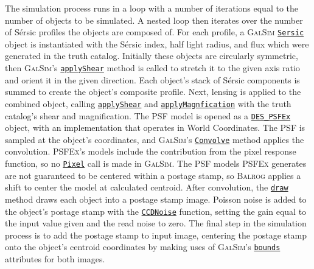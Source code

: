 \documentclass[11pt]{book}
\newcommand{\galsim}{\textsc{GalSim}}
\newcommand{\balrog}{\textsc{Balrog}}
\newcommand{\psfex}{\textsc{PSFEx}}
\newcommand{\sersic}{S\'{e}rsic}
\begin{document}
The simulation process runs in a loop with a number of iterations equal to the number of objects to be simulated.
A nested loop then iterates over the number of \sersic{} profiles the objects are composed of.
For each profile, a \galsim{} \href{http://galsim-developers.github.io/GalSim/classgalsim\_1\_1base\_1\_1\_sersic.html}{\texttt{Sersic}}
object is instantiated with the \sersic{} index,
half light radius, and flux which were generated in the truth catalog. Initially these objects are circularly symmetric,
then \galsim{}'s \href{http://galsim-developers.github.io/GalSim/classgalsim\_1\_1base\_1\_1\_g\_s\_object.html#a85cc0094dcf470cfbff93d9830ab80bd}{\texttt{applyShear}} 
method is called to stretch it to the given axis ratio and orient it in the given direction.
Each object's stack of \sersic{} components is summed to create the object's composite profile. 
Next, lensing is applied to the combined object, 
calling \href{http://galsim-developers.github.io/GalSim/classgalsim\_1\_1base\_1\_1\_g\_s\_object.html#a85cc0094dcf470cfbff93d9830ab80bd}{\texttt{applyShear}}
and \href{http://galsim-developers.github.io/GalSim/classgalsim\_1\_1base\_1\_1\_g\_s\_object.html#a9d13b0238057f6d5d01f2681d91c09b0}{\texttt{applyMagnfication}}
with the truth catalog's shear and magnification.
The PSF model is opened as a 
\href{http://galsim-developers.github.io/GalSim/classgalsim\_1\_1des\_1\_1des\_\_psfex\_1\_1\_d\_e\_s\_\_\_p\_s\_f\_ex.html}{\texttt{DES\_PSFEx}} object, 
with an implementation that operates in World Coordinates. 
The PSF is sampled at the object's coordinates, 
and \galsim{}'s \href{http://galsim-developers.github.io/GalSim/classgalsim\_1\_1compound\_1\_1\_convolution.html}{\texttt{Convolve}} method applies the convolution.
\psfex{}'s models include the contribution from the pixel response function, 
so no \href{http://galsim-developers.github.io/GalSim/classgalsim\_1\_1base\_1\_1\_pixel.html}{\texttt{Pixel}} call is made in \galsim{}.
The PSF models \psfex{} generates are not guaranteed to be centered within a postage stamp, 
so \balrog{} applies a shift to center the model at calculated centroid.
After convolution, 
the \href{http://galsim-developers.github.io/GalSim/classgalsim\_1\_1base\_1\_1\_g\_s\_object.html#ae0b346a8b438dedbc7f60a52220869d8}{\texttt{draw}} 
method draws each object into a postage stamp image.
Poisson noise is added to the object's postage stamp with the 
\href{http://galsim-developers.github.io/GalSim/classgalsim\_1\_1\_c\_c\_d\_noise.html}{\texttt{CCDNoise}} function, 
setting the gain equal to the input value given and the read noise to zero.
The final step in the simulation process is to add the postage stamp to input image, 
centering the postage stamp onto the object's centroid coordinates 
by making uses of \galsim{}'s \href{http://galsim-developers.github.io/GalSim/classgalsim\_1\_1\_bounds.html}{\texttt{bounds}} attributes for both images.
\end{document}
